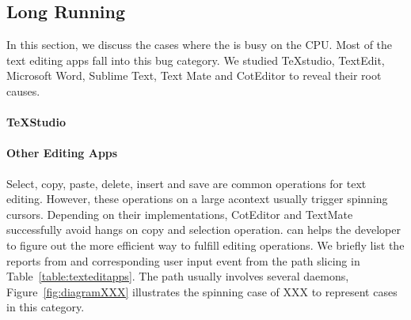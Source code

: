 \subsection{Long Running}

In this section, we discuss the cases where the \spinningnode is busy on the
CPU. Most of the text editing apps fall into this bug category. We studied
TeXstudio, TextEdit, Microsoft Word, Sublime Text, Text Mate and CotEditor to
reveal their root causes.

\paragraph{TeXStudio}


\paragraph{Other Editing Apps}

Select, copy, paste, delete, insert and save are common operations for text
editing. However, these operations on a large acontext usually trigger spinning
cursors. Depending on their implementations, CotEditor and TextMate successfully
avoid hangs on copy and selection operation. \xxx can helps the developer to
figure out the more efficient way to fulfill editing operations. We briefly list
the reports from \spinningnode and corresponding user input event from the path
slicing in Table~\ref{table:texteditapps}. The path usually involves several
daemons, Figure~\ref{fig:diagramXXX} illustrates the spinning case of XXX to
represent cases in this category.

